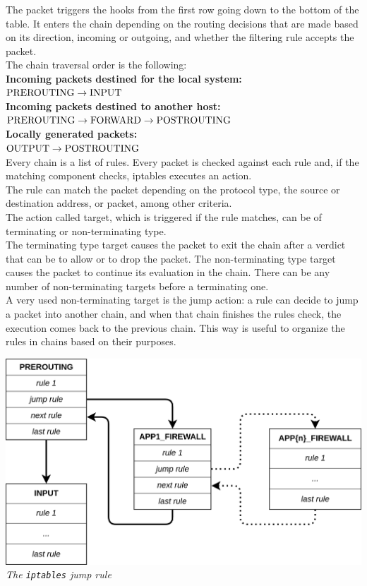\documentclass[12pt]{article}
\begin{document}
	
	\bigbreak

	The packet triggers the hooks from the first row going down to the bottom of the table. It enters the chain depending on the routing decisions that are made based on its direction, incoming or outgoing, and whether the filtering rule accepts the packet.\\
	\bigbreak
	The chain traversal order is the following:\\	
	\textbf{Incoming packets destined for the local system:}\\
	$\hbox{PREROUTING} \rightarrow \hbox{INPUT}$\\
	\medskip
	\textbf{Incoming packets destined to another host:}\\
	$\hbox{PREROUTING} \rightarrow \hbox{FORWARD} \rightarrow \hbox{POSTROUTING}$\\
	\medskip
	\textbf{Locally generated packets:}\\
	$\hbox{OUTPUT} \rightarrow \hbox{POSTROUTING}$\\

	\bigbreak
	Every chain is a list of rules. Every packet is checked against each rule and, if the matching component checks, iptables executes an action.\\
	The rule can match the packet depending on the protocol type, the source or destination address, or packet, among other criteria.\\
	The action called target, which is triggered if the rule matches, can be of terminating or non-terminating type.\\
	The terminating type target causes the packet to exit the chain after a verdict that can be to allow or to drop the packet. The non-terminating type target causes the packet to continue its evaluation in the chain. There can be any number of non-terminating targets before a terminating one.\\
	A very used non-terminating target is the jump action: a rule can decide to jump a packet into another chain, and when that chain finishes the rules check, the execution comes back to the previous chain. This way is useful to organize the rules in chains based on their purposes.\\
	\bigbreak

	\begin{center}
		\includegraphics[width=\linewidth]{images/iptables_jump_chains.png}
		\small{\textit{The \lstinline{iptables} jump rule}}
	\end{center}
	\bigbreak
\end{document}
